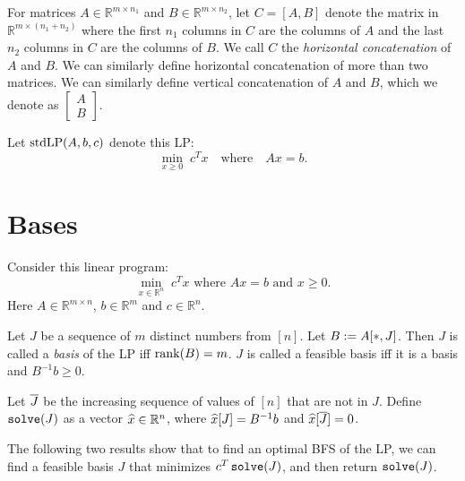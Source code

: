 For matrices $A \in \mathbb{R}^{m \times n_1}$ and $B \in \mathbb{R}^{m \times n_2}$,
let $C = [A, B]$ denote the matrix in $\mathbb{R}^{m \times (n_1 + n_2)}$
where the first $n_1$ columns in $C$ are the columns of $A$
and the last $n_2$ columns in $C$ are the columns of $B$.
We call $C$ the \emph{horizontal concatenation} of $A$ and $B$.
We can similarly define horizontal concatenation of more than two matrices.
We can similarly define vertical concatenation of $A$ and $B$,
which we denote as $\begin{bmatrix}A\\B\end{bmatrix}$.

\begin{definition}
Let $\operatorname{stdLP}(A, b, c)$ denote this LP:
\[ \min_{x \ge 0}\; c^Tx \quad\textrm{where}\quad Ax = b. \]
\end{definition}

\section{Bases}

Consider this linear program:
\[ \min_{x \in \mathbb{R}^n}\; c^Tx \textrm{ where } Ax = b \textrm{ and } x \ge 0. \]
Here $A \in \mathbb{R}^{m \times n}$, $b \in \mathbb{R}^m$ and $c \in \mathbb{R}^n$.

\begin{definition}[Basis]
Let $J$ be a sequence of $m$ distinct numbers from $[n]$.
Let $B := A[*,J]$.
Then $J$ is called a \emph{basis} of the LP iff $\operatorname{rank}(B) = m$.
$J$ is called a feasible basis iff it is a basis and $B^{-1}b \ge 0$.

Let $\overline{J}$ be the increasing sequence of values of $[n]$ that are not in $J$.
Define $\operatorname{\mathtt{solve}}(J)$ as a vector $\widehat{x} \in \mathbb{R}^n$,
where $\widehat{x}[J] = B^{-1}b$ and $\widehat{x}[\overline{J}] = 0$.
\end{definition}

The following two results show that to find an optimal BFS of the LP,
we can find a feasible basis $J$ that minimizes $c^T\operatorname{\mathtt{solve}}(J)$, and then return $\operatorname{\mathtt{solve}}(J)$.

